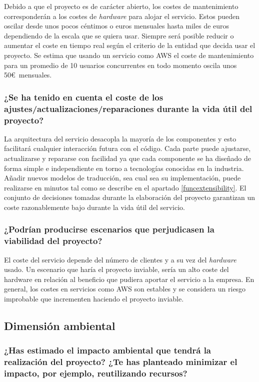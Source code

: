 Debido a que el proyecto es de carácter abierto, los costes de mantenimiento corresponderán a los costes de \textit{hardware} para alojar el servicio. Estos pueden oscilar desde unos pocos céntimos o euros mensuales hasta miles de euros dependiendo de la escala que se quiera usar. Siempre será posible reducir o aumentar el coste en tiempo real según el criterio de la entidad que decida usar el proyecto. Se estima que usando un servicio como AWS el coste de mantenimiento para un promedio de 10 usuarios concurrentes en todo momento oscila unos 50\euro\ mensuales.

\subsubsection{¿Se ha tenido en cuenta el coste de los ajustes/actualizaciones/reparaciones durante la vida útil del proyecto?}
La arquitectura del servicio desacopla la mayoría de los componentes y esto facilitará cualquier interacción futura con el código. Cada parte puede ajustarse, actualizarse y repararse con facilidad ya que cada componente se ha diseñado de forma simple e independiente en torno a tecnologías conocidas en la industria. Añadir nuevos modelos de traducción, sea cual sea su implementación, puede realizarse en minutos tal como se describe en el apartado \ref{funcextensibility}. El conjunto de decisiones tomadas durante la elaboración del proyecto garantizan un coste razonablemente bajo durante la vida útil del servicio.

\subsubsection{¿Podrían producirse escenarios que perjudicasen la viabilidad del proyecto?}
El coste del servicio depende del número de clientes y a su vez del \textit{hardware} usado. Un escenario que haría el proyecto inviable, sería un alto coste del hardware en relación al beneficio que pudiera aportar el servicio a la empresa.
En general, los costes en servicios como AWS son estables y se considera un riesgo improbable que incrementen haciendo el proyecto inviable.

\subsection{Dimensión ambiental}
\subsubsection{¿Has estimado el impacto ambiental que tendrá la realización del proyecto? ¿Te has planteado minimizar el impacto, por ejemplo, reutilizando recursos?}\label{susambmedth}


